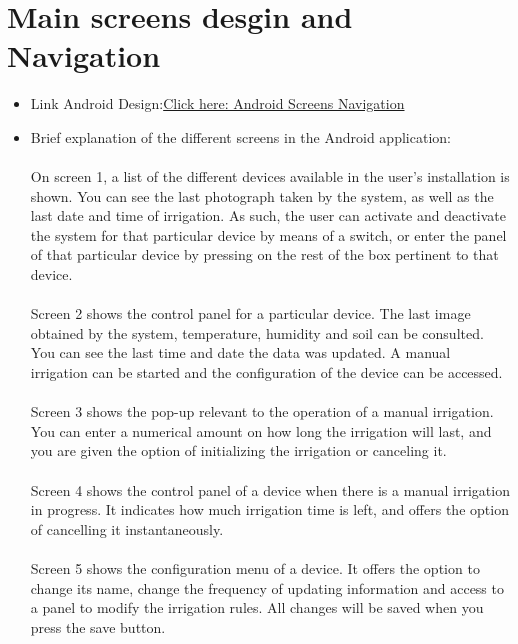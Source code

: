 \documentclass[11pt,a4paper]{article}
\begin{document}
\section{Main screens desgin and Navigation}
\begin{itemize}
\item Link Android Design:\newline\newline \textcolor{blue}{\href{https://drive.google.com/file/d/1iBzNTxSh7TKeROfKx1e6nnOgNSITOXWP/view?usp=sharing}{Click here: Android Screens Navigation}}

\item Brief explanation of the different screens in the Android application: 
\\ \\
On screen 1, a list of the different devices available in the user's installation is shown. You can see the last photograph taken by the system, as well as the last date and time of irrigation. As such, the user can activate and deactivate the system for that particular device by means of a switch, or enter the panel of that particular device by pressing on the rest of the box pertinent to that device. 
\\ \\
Screen 2 shows the control panel for a particular device. The last image obtained by the system, temperature, humidity and soil can be consulted. 
You can see the last time and date the data was updated. A manual irrigation can be started and the configuration of the device can be accessed.
\\ \\
Screen 3 shows the pop-up relevant to the operation of a manual irrigation. You can enter a numerical amount on how long the irrigation will last, and you are given the option of initializing the irrigation or canceling it.
\\ \\
Screen 4 shows the control panel of a device when there is a manual irrigation in progress. It indicates how much irrigation time is left, and offers the option of cancelling it instantaneously. 
\\ \\
Screen 5 shows the configuration menu of a device. It offers the option to change its name, change the frequency of updating information and access to a panel to modify the irrigation rules. All changes will be saved when you press the save button. 
\\ \\

\end{itemize}
\end{document}
